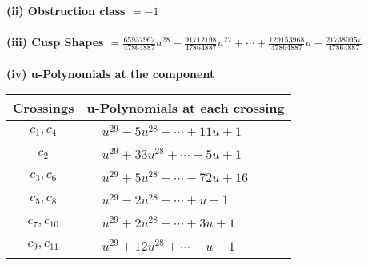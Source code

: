 \documentclass[1p]{elsarticle_modified}
\theoremstyle{definition}
\begin{document}
\flushleft \textbf{(ii) Obstruction class $= -1$}\\~\\
\flushleft \textbf{(iii) Cusp Shapes $= \frac{65937967}{47864887} u^{28}-\frac{91712198}{47864887} u^{27}+\cdots+\frac{129153968}{47864887} u-\frac{217380957}{47864887}$}\\~\\
\newpage\renewcommand{\arraystretch}{1}
\flushleft \textbf{(iv) u-Polynomials at the component}\newline \\
\begin{tabular}{m{50pt}|m{274pt}}
Crossings & \hspace{64pt}u-Polynomials at each crossing \\
\hline $$\begin{aligned}c_{1},c_{4}\end{aligned}$$&$\begin{aligned}
&u^{29}-5 u^{28}+\cdots+11 u+1
\end{aligned}$\\
\hline $$\begin{aligned}c_{2}\end{aligned}$$&$\begin{aligned}
&u^{29}+33 u^{28}+\cdots+5 u+1
\end{aligned}$\\
\hline $$\begin{aligned}c_{3},c_{6}\end{aligned}$$&$\begin{aligned}
&u^{29}+5 u^{28}+\cdots-72 u+16
\end{aligned}$\\
\hline $$\begin{aligned}c_{5},c_{8}\end{aligned}$$&$\begin{aligned}
&u^{29}-2 u^{28}+\cdots+u-1
\end{aligned}$\\
\hline $$\begin{aligned}c_{7},c_{10}\end{aligned}$$&$\begin{aligned}
&u^{29}+2 u^{28}+\cdots+3 u+1
\end{aligned}$\\
\hline $$\begin{aligned}c_{9},c_{11}\end{aligned}$$&$\begin{aligned}
&u^{29}+12 u^{28}+\cdots- u-1
\end{aligned}$\\
\hline
\end{tabular}\\~\\
\end{document}
